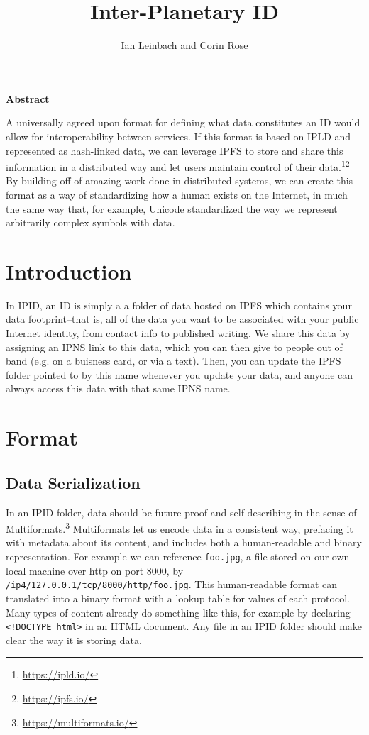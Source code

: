 \documentclass{article}
\author{Ian Leinbach and Corin Rose}
\title{Inter-Planetary ID}
\begin{document}
\maketitle

\begin{center}
\textbf{Abstract} 
\end{center}

A universally agreed upon format for defining what data constitutes an ID would allow for interoperability between services. If this format is based on IPLD and represented as hash-linked data, we can leverage IPFS to store and share this information in a distributed way and let users maintain control of their data.\footnote{\url{https://ipld.io/}}\footnote{\url{https://ipfs.io/}} By building off of amazing work done in distributed systems, we can create this format as a way of standardizing how a human exists on the Internet, in much the same way that, for example, Unicode standardized the way we represent arbitrarily complex symbols with data.  

\section{Introduction}
In IPID, an ID is simply a a folder of data hosted on IPFS which contains your data footprint--that is, all of the data you want to be associated with your public Internet identity, from contact info to published writing. We share this data by assigning an IPNS link to this data, which you can then give to people out of band (e.g. on a buisness card, or via a text). Then, you can update the IPFS folder pointed to by this name whenever you update your data, and anyone can always access this data with that same IPNS name. 

\section{Format}

\subsection{Data Serialization}

In an IPID folder, data should be future proof and self-describing in the sense of Multiformats.\footnote{\url{https://multiformats.io/}} Multiformats let us encode data in a consistent way, prefacing it with metadata about its content, and includes both a human-readable and binary representation. For example we can reference \texttt{foo.jpg}, a file stored on our own local machine over http on port 8000, by \texttt{/ip4/127.0.0.1/tcp/8000/http\-/foo.jpg}. This human-readable format can translated into a binary format with a lookup table for values of each protocol. Many types of content already do something like this, for example by declaring \texttt{<!DOCTYPE html>} in an HTML document. Any file in an IPID folder should make clear the way it is storing data.   
\end{document}
